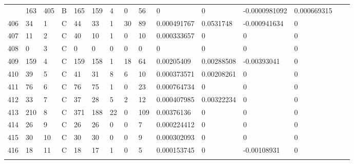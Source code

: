 \begin{longtable}{lllllllllllllll}
\begin{comment}
	405 & 163               & 405 & B   & 165               & 159               & 4                 & 0    & 56         & 0              & 0              & -0.0000981092 & 0.000669315  \\
	406 & 34                & 1   & C   & 44                & 33                & 1                 & 30   & 89         & 0.000491767    & 0.0531748      & -0.000941634  & 0            \\
	407 & 11                & 2   & C   & 40                & 10                & 1                 & 0    & 10         & 0.000333657    & 0              & 0             & 0            \\
	408 & 0                 & 3   & C   & 0                 & 0                 & 0                 & 0    & 0          & 0              & 0              & 0             & 0            \\
	409 & 159               & 4   & C   & 159               & 158               & 1                 & 18   & 64         & 0.00205409     & 0.00288508     & -0.00393041   & 0            \\
	410 & 39                & 5   & C   & 41                & 31                & 8                 & 6    & 10         & 0.000373571    & 0.00208261     & 0             & 0            \\
	411 & 76                & 6   & C   & 76                & 75                & 1                 & 0    & 23         & 0.000764734    & 0              & 0             & 0            \\
	412 & 33                & 7   & C   & 37                & 28                & 5                 & 2    & 12         & 0.000407985    & 0.00322234     & 0             & 0            \\
	413 & 210               & 8   & C   & 371               & 188               & 22                & 0    & 109        & 0.00376136     & 0              & 0             & 0            \\
	414 & 26                & 9   & C   & 26                & 26                & 0                 & 0    & 7          & 0.000224412    & 0              & 0             & 0            \\
	415 & 30                & 10  & C   & 30                & 30                & 0                 & 0    & 9          & 0.000302093    & 0              & 0             & 0            \\
	416 & 18                & 11  & C   & 18                & 17                & 1                 & 0    & 5          & 0.000153745    & 0              & -0.00108931   & 0            \\

\end{comment}
\end{longtable}
